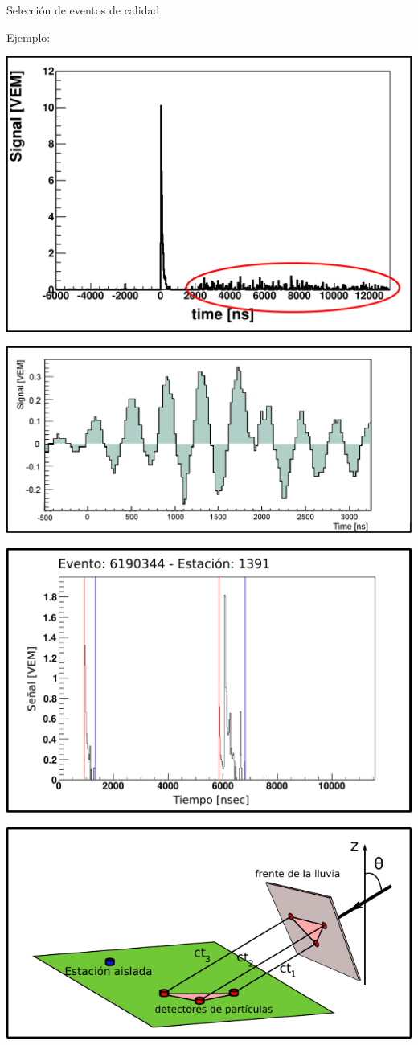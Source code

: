 \begin{frame}{Selecci\'on de eventos de calidad}
\begin{exampleblock}{Ejemplo:}
 \begin{overprint}
 \centerline{\includegraphics[height=0.35\textwidth]{fig/seleccionAuger/pmt2_border}}
 \centerline{\includegraphics[height=0.35\textwidth]{fig/seleccionAuger/lighting}}
 \centerline{\includegraphics[height=0.35\textwidth]{fig/seleccionAuger/badStartTime}}
 \centerline{\includegraphics[height=0.35\textwidth]{fig/seleccionAuger/geome2}}
 \end{overprint}
\end{exampleblock}
\end{frame}


